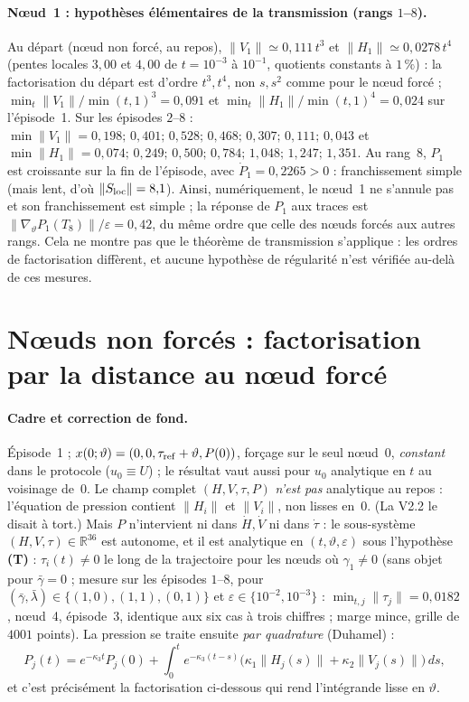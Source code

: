 \documentclass[11pt,a4paper]{article}
\theoremstyle{remark}
\newcommand{\R}{\mathbb R}
\newcommand{\vth}{\vartheta}
\begin{document}
\paragraph{N\oe ud~1 : hypoth\`eses \'el\'ementaires de la transmission (rangs $1$--$8$).} Au d\'epart (n\oe ud non forc\'e, au repos), $\lVert V_1\rVert\simeq0{,}111\,t^3$ et $\lVert H_1\rVert\simeq0{,}0278\,t^4$ (pentes locales $3{,}00$ et $4{,}00$ de $t=10^{-3}$ \`a $10^{-1}$, quotients constants \`a $1\,\%$) : la factorisation du d\'epart est d'ordre $t^3,t^4$, non $s,s^2$ comme pour le n\oe ud forc\'e ; $\min_t\lVert V_1\rVert/\min(t,1)^3=0{,}091$ et $\min_t\lVert H_1\rVert/\min(t,1)^4=0{,}024$ sur l'\'episode~1. Sur les \'episodes $2$--$8$ : $\min\lVert V_1\rVert=0{,}198;\,0{,}401;\,0{,}528;\,0{,}468;\,0{,}307;\,0{,}111;\,0{,}043$ et $\min\lVert H_1\rVert=0{,}074;\,0{,}249;\,0{,}500;\,0{,}784;\,1{,}048;\,1{,}247;\,1{,}351$. Au rang~8, $P_1$ est croissante sur la fin de l'\'episode, avec $\dot P_1=0{,}2265>0$ : franchissement simple (mais lent, d'o\`u $\lVert S_{\rm loc}\rVert=8{,}1$). Ainsi, num\'eriquement, le n\oe ud~1 ne s'annule pas et son franchissement est simple ; la r\'eponse de $P_1$ aux traces est $\lVert\nabla_\vth P_1(T_8)\rVert/\varepsilon=0{,}42$, du m\^eme ordre que celle des n\oe uds forc\'es aux autres rangs. Cela ne montre pas que le th\'eor\`eme de transmission s'applique : les ordres de factorisation diff\`erent, et aucune hypoth\`ese de r\'egularit\'e n'est v\'erifi\'ee au-del\`a de ces mesures.


\section{N\oe uds non forc\'es : factorisation par la distance au n\oe ud forc\'e}\label{sec:fact}
\paragraph{Cadre et correction de fond.} \'Episode~1 ; $x(0;\vth)=(0,0,\tau_{\rm ref}+\vth,P(0))$, for\c{c}age sur le seul n\oe ud~0, \emph{constant} dans le protocole ($u_0\equiv U$) ; le r\'esultat vaut aussi pour $u_0$ analytique en $t$ au voisinage de~$0$. Le champ complet $(H,V,\tau,P)$ \emph{n'est pas} analytique au repos : l'\'equation de pression contient $\lVert H_i\rVert$ et $\lVert V_i\rVert$, non lisses en~$0$. (La V2.2 le disait \`a tort.) Mais $P$ n'intervient ni dans $\dot H,\dot V$ ni dans $\dot\tau$ : le sous-syst\`eme $(H,V,\tau)\in\R^{36}$ est autonome, et il est analytique en $(t,\vth,\varepsilon)$ sous l'hypoth\`ese \textbf{(T)} : $\tau_i(t)\ne0$ le long de la trajectoire pour les n\oe uds o\`u $\gamma_1\ne0$ (sans objet pour $\bar\gamma=0$ ; mesure sur les \'episodes $1$--$8$, pour $(\bar\gamma,\bar\lambda)\in\{(1,0),(1,1),(0,1)\}$ et $\varepsilon\in\{10^{-2},10^{-3}\}$ : $\min_{t,j}\lVert\tau_j\rVert=0{,}0182$, n\oe ud~4, \'episode~3, identique aux six cas \`a trois chiffres ; marge mince, grille de $4001$ points). La pression se traite ensuite \emph{par quadrature} (Duhamel) :
\[ P_j(t)=e^{-\kappa_3t}P_j(0)+\int_0^te^{-\kappa_3(t-s)}\bigl(\kappa_1\lVert H_j(s)\rVert+\kappa_2\lVert V_j(s)\rVert\bigr)\,ds, \]
et c'est pr\'ecis\'ement la factorisation ci-dessous qui rend l'int\'egrande lisse en $\vth$.
\end{document}
